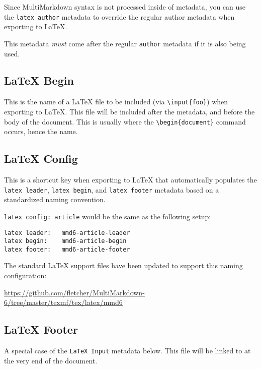 Since MultiMarkdown syntax is not processed inside of metadata, you can use the \texttt{latex author} metadata to override the regular author metadata when exporting to LaTeX.

This metadata \emph{must} come after the regular \texttt{author} metadata if it is also being used.

\subsection{LaTeX Begin }
\label{latexbegin}

This is the name of a LaTeX file to be included (via \texttt{\textbackslash{}input\{foo\}}) when exporting to LaTeX. This file will be included after the metadata, and before the body of the document. This is usually where the \texttt{\textbackslash{}begin\{document\}} command occurs, hence the name.

\subsection{LaTeX Config }
\label{latexconfig}

This is a shortcut key when exporting to LaTeX that automatically populates the \texttt{latex leader}, \texttt{latex begin}, and \texttt{latex footer} metadata based on a standardized naming convention.

\texttt{latex config: article} would be the same as the following setup:

\begin{verbatim}
latex leader:	mmd6-article-leader
latex begin:	mmd6-article-begin
latex footer:	mmd6-article-footer
\end{verbatim}

The standard LaTeX support files have been updated to support this naming configuration:

\href{https://github.com/fletcher/MultiMarkdown-6/tree/master/texmf/tex/latex/mmd6}{https:\slash \slash github.com\slash fletcher\slash MultiMarkdown-6\slash tree\slash master\slash texmf\slash tex\slash latex\slash mmd6}

\subsection{LaTeX Footer }
\label{latexfooter}

A special case of the \texttt{LaTeX Input} metadata below. This file will be linked
to at the very end of the document.

